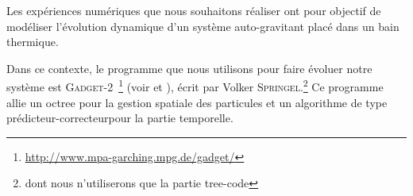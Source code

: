 		Les expériences numériques que nous souhaitons réaliser ont pour objectif de modéliser l'évolution
		dynamique d'un système auto-gravitant placé dans un bain thermique.


		Dans ce contexte, le programme que nous utilisons pour faire évoluer notre système est
		\textsc{Gadget-2}~\footnote{\url{http://www.mpa-garching.mpg.de/gadget/}} (voir \cite{gadget2} et \cite{gadget1}),
		écrit par Volker \textsc{Springel}.\footnote{dont nous n'utiliserons que la partie \og{}tree-code\fg}
		Ce programme allie un octree pour la gestion spatiale des particules et un algorithme de type \og
		prédicteur-correcteur\fg pour la partie temporelle.



